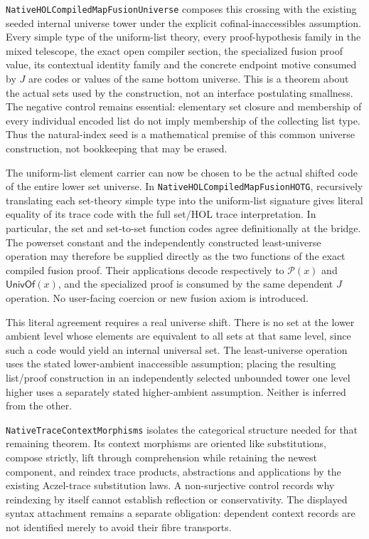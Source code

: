 \documentclass[11pt]{article}
\theoremstyle{definition}
\theoremstyle{remark}
\begin{document}
\nolinkurl{NativeHOLCompiledMapFusionUniverse} composes this crossing with
the existing seeded internal universe tower under the explicit
cofinal-inaccessibles assumption. Every simple type of the uniform-list
theory, every proof-hypothesis family in the mixed telescope, the exact open
compiler section, the specialized fusion proof value, its contextual identity
family and the concrete endpoint motive consumed by \(J\) are codes or values
of the same bottom universe. This is a theorem about the actual sets used by
the construction, not an interface postulating smallness. The negative
control remains essential: elementary set closure and membership of every
individual encoded list do not imply membership of the collecting list type.
Thus the natural-index seed is a mathematical premise of this common
universe construction, not bookkeeping that may be erased.

The uniform-list element carrier can now be chosen to be the actual shifted
code of the entire lower set universe. In
\nolinkurl{NativeHOLCompiledMapFusionHOTG}, recursively translating each
set-theory simple type into the uniform-list signature gives literal equality
of its trace code with the full set/HOL trace interpretation. In particular,
the set and set-to-set function codes agree definitionally at the bridge.
The powerset constant and the independently constructed least-universe
operation may therefore be supplied directly as the two functions of the
exact compiled fusion proof. Their applications decode respectively to
\(\mathcal P(x)\) and \(\mathsf{UnivOf}(x)\), and the specialized proof is
consumed by the same dependent \(J\) operation. No user-facing coercion or
new fusion axiom is introduced.

This literal agreement requires a real universe shift. There is no set at
the lower ambient level whose elements are equivalent to all sets at that
same level, since such a code would yield an internal universal set. The
least-universe operation uses the stated lower-ambient inaccessible
assumption; placing the resulting list/proof construction in an independently
selected unbounded tower one level higher uses a separately stated
higher-ambient assumption. Neither is inferred from the other.

\nolinkurl{NativeTraceContextMorphisms} isolates the categorical structure
needed for that remaining theorem. Its context morphisms are oriented like
substitutions, compose strictly, lift through comprehension while retaining
the newest component, and reindex trace products, abstractions and
applications by the existing Aczel-trace substitution laws. A
non-surjective control records why reindexing by itself cannot establish
reflection or conservativity. The displayed syntax attachment remains a
separate obligation: dependent context records are not identified merely to
avoid their fibre transports.
\end{document}
